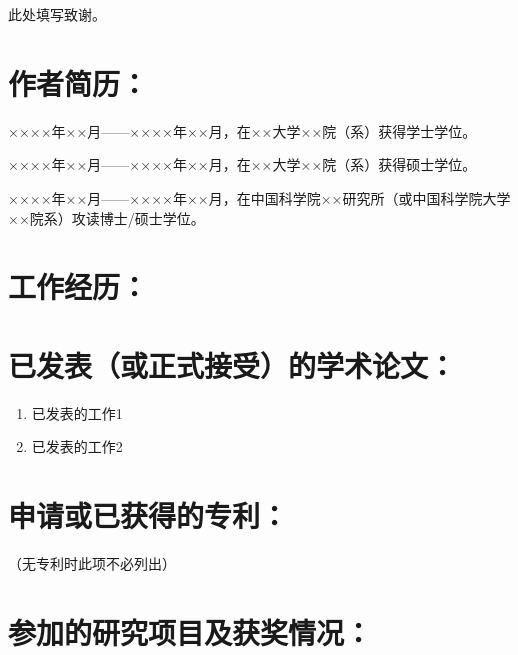 
\intobmk*{\cleardoublepage}{\acknowledgeNameMark}
\begin{center}
    \heiti\bfseries{}\acknowledgeName
    \thispagestyle{plain}
\end{center}
\pagestyle{plain}

此处填写致谢。

\lipsum[1-3]


\cleardoublepage[plain]

\intobmk*{\cleardoublepage}{\achievementNameMark}
\begin{center}
    \heiti\bfseries{}\achievementName
    \thispagestyle{plain}
\end{center}
\pagestyle{plain}

\section*{作者简历：}
××××年××月——××××年××月，在××大学××院（系）获得学士学位。

××××年××月——××××年××月，在××大学××院（系）获得硕士学位。

××××年××月——××××年××月，在中国科学院××研究所（或中国科学院大学××院系）攻读博士/硕士学位。

\section*{工作经历：}

\lipsum[1-2]

\section*{已发表（或正式接受）的学术论文：}

{
    \setlist[enumerate]{}
    \begin{enumerate}
        \item 已发表的工作1
        \item 已发表的工作2
    \end{enumerate}
}

\section*{申请或已获得的专利：}

（无专利时此项不必列出）

\section*{参加的研究项目及获奖情况：}

\lipsum[1]

\cleardoublepage[plain]%
